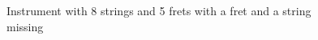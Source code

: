 \documentclass[12pt,letterpaper]{article}
\begin{document}
\begin{figure}[H]
\centering
  \caption{Instrument with 8 strings and 5 frets with a fret and a string missing}
\end{figure}
\end{document}
